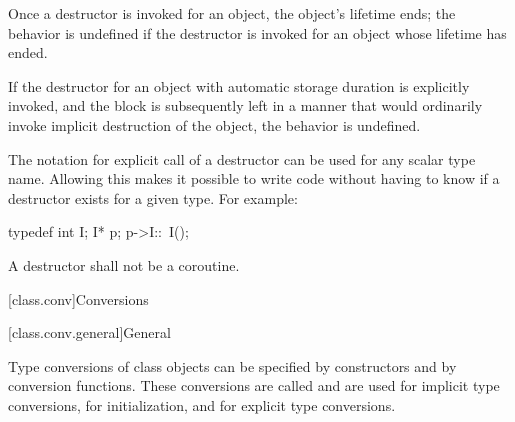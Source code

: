 \pnum
Once a destructor is invoked for an object, the object's lifetime ends;
the behavior is undefined if the destructor is invoked
%
%
%
%
%
for an object whose lifetime has ended.
\begin{example}
If the destructor for an object with automatic storage duration is explicitly invoked,
and the block is subsequently left in a manner that would ordinarily
invoke implicit destruction of the object, the behavior is undefined.
\end{example}

\pnum
\begin{note}
%
The notation for explicit call of a destructor can be used for any scalar type
name.
Allowing this makes it possible to write code without having to know if a
destructor exists for a given type.
For example:
\begin{codeblock}
typedef int I;
I* p;
p->I::~I();
\end{codeblock}
\end{note}

\pnum
A destructor shall not be a coroutine.

[class.conv]{Conversions}

[class.conv.general]{General}

\pnum
{}%
%
%
%
Type conversions of class objects can be specified by constructors and
by conversion functions.
These conversions are called
and are used for implicit type conversions,
for initialization,
and for explicit type conversions.

